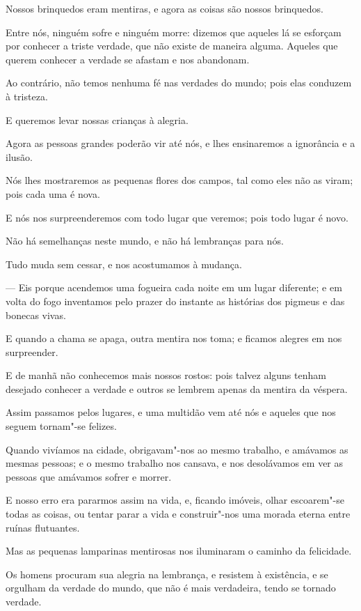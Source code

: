 Nossos brinquedos eram mentiras, e agora as coisas são nossos
brinquedos.

Entre nós, ninguém sofre e ninguém morre: dizemos que aqueles lá se
esforçam por conhecer a triste verdade, que não existe de maneira alguma.
Aqueles que querem conhecer a verdade se afastam e nos abandonam.

Ao contrário, não temos nenhuma fé nas verdades do mundo; pois elas
conduzem à tristeza.

E queremos levar nossas crianças à alegria.

Agora as pessoas grandes poderão vir até nós, e lhes ensinaremos a
ignorância e a ilusão.

Nós lhes mostraremos as pequenas flores dos campos, tal como eles não
as viram; pois cada uma é nova.

E nós nos surpreenderemos com todo lugar que veremos; pois todo lugar é
novo.

Não há semelhanças neste mundo, e não há lembranças para nós.

Tudo muda sem cessar, e nos acostumamos à mudança.

--- Eis porque acendemos uma fogueira cada noite em um lugar diferente;
e em volta do fogo inventamos pelo prazer do instante as histórias dos
pigmeus e das bonecas vivas.

E quando a chama se apaga, outra mentira nos toma; e ficamos alegres em
nos surpreender.

E de manhã não conhecemos mais nossos rostos: pois talvez alguns tenham
desejado conhecer a verdade e outros se lembrem apenas da mentira da
véspera.

Assim passamos pelos lugares, e uma multidão vem até nós e aqueles que
nos seguem tornam"-se felizes.

Quando vivíamos na cidade, obrigavam"-nos ao mesmo trabalho, e amávamos
as mesmas pessoas; e o mesmo trabalho nos cansava, e nos desolávamos em
ver as pessoas que amávamos sofrer e morrer.

E nosso erro era pararmos assim na vida, e, ficando imóveis, olhar
escoarem"-se todas as coisas, ou tentar parar a vida e construir"-nos uma
morada eterna entre ruínas flutuantes.

Mas as pequenas lamparinas mentirosas nos iluminaram o caminho da
felicidade.

Os homens procuram sua alegria na lembrança, e resistem à existência, e
se orgulham da verdade do mundo, que não é mais verdadeira, tendo se
tornado verdade.


